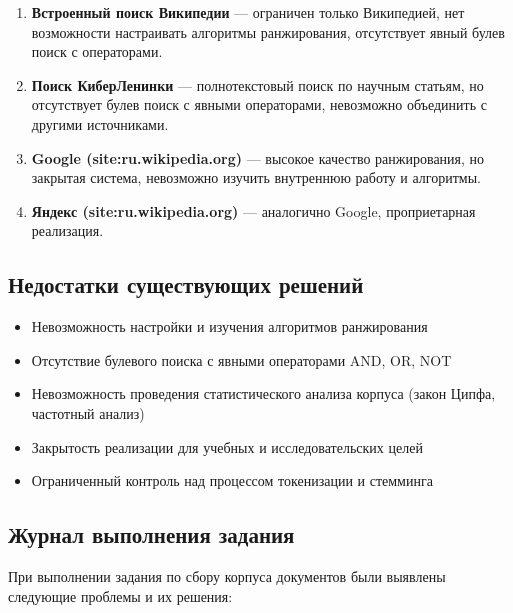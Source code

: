 \begin{enumerate}
    \item \textbf{Встроенный поиск Википедии} --- ограничен только Википедией, нет возможности настраивать алгоритмы ранжирования, отсутствует явный булев поиск с операторами.
    
    \item \textbf{Поиск КиберЛенинки} --- полнотекстовый поиск по научным статьям, но отсутствует булев поиск с явными операторами, невозможно объединить с другими источниками.
    
    \item \textbf{Google (site:ru.wikipedia.org)} --- высокое качество ранжирования, но закрытая система, невозможно изучить внутреннюю работу и алгоритмы.
    
    \item \textbf{Яндекс (site:ru.wikipedia.org)} --- аналогично Google, проприетарная реализация.
\end{enumerate}

\subsection{Недостатки существующих решений}

\begin{itemize}
    \item Невозможность настройки и изучения алгоритмов ранжирования
    \item Отсутствие булевого поиска с явными операторами AND, OR, NOT
    \item Невозможность проведения статистического анализа корпуса (закон Ципфа, частотный анализ)
    \item Закрытость реализации для учебных и исследовательских целей
    \item Ограниченный контроль над процессом токенизации и стемминга
\end{itemize}

\subsection{Журнал выполнения задания}

При выполнении задания по сбору корпуса документов были выявлены следующие проблемы и их решения:

